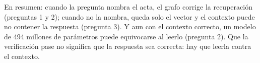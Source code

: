 \documentclass[10pt,letterpaper]{article}
\begin{document}
En resumen: cuando la pregunta nombra el acta, el grafo corrige la recuperación (preguntas 1 y 2); cuando
no la nombra, queda solo el vector y el contexto puede no contener la respuesta (pregunta 3). Y aun con
el contexto correcto, un modelo de 494 millones de parámetros puede equivocarse al leerlo (pregunta 2).
Que la verificación pase no significa que la respuesta sea correcta: hay que leerla contra el contexto.
\end{document}
